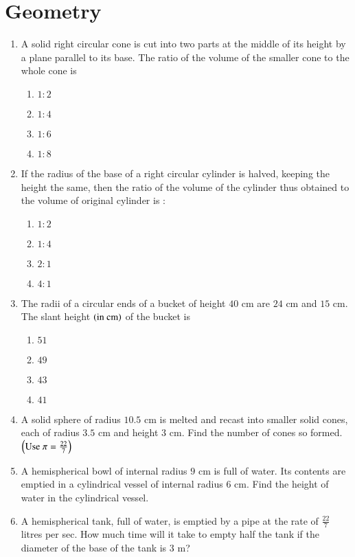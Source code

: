 \documentclass[journal,12pt,onecolumn]{IEEEtran}
\theoremstyle{remark}
\begin{document}
\section{Geometry}
\begin{enumerate}
\item A solid right circular cone is cut into two parts at the middle of its height by a plane parallel to its base. The ratio of the volume of the smaller cone to the whole cone is 
\begin{enumerate}
\item $1 : 2$ 
\item $1 : 4$ 
\item $1 : 6$ 
\item $1 : 8$ 
\end{enumerate}
\item If the radius of the base of a right circular cylinder is halved, keeping the height the same, then the ratio of the volume of the cylinder thus obtained to the volume of original cylinder is : 
\begin{enumerate}
\item $1 : 2$ 
\item $1 : 4$ 
\item $2 : 1$ 
\item $4 : 1$ 
\end{enumerate}
\item The radii of a circular ends of a bucket of height $40\text{ cm}$ are $24\text{ cm}$ and $15\text{ cm}$. The slant height $\left(\text{in cm}\right)$ of the bucket is 
\begin{enumerate}
\item $51$ 
\item $49$ 
\item $43$ 
\item $41$ 
\end{enumerate}

\item A solid sphere of radius $10.5 \text{ cm}$ is melted and recast into smaller solid cones, each of radius $3.5 \text{ cm}$ and height $3 \text{ cm}$. Find the number of cones so formed. $\left(\text{Use } \pi = \frac{22}{7}\right)$ 

\item A hemispherical bowl of internal radius $9 \text{ cm}$ is full of water. Its contents are emptied in a cylindrical vessel of internal radius $6 \text{ cm}$. Find the height of water in the cylindrical vessel. 


\item A hemispherical tank, full of water, is emptied by a pipe at the rate of $\frac{22}{7}$ litres per sec. How much time will it take to empty half the tank if the diameter of the base of the tank is $3 \text{ m}$? 


\end{enumerate}
\end{document}
